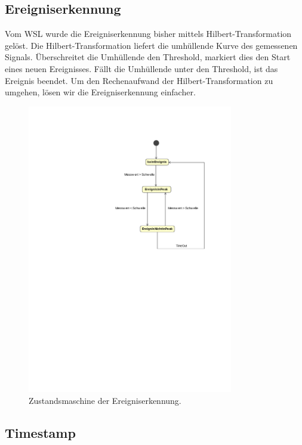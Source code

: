 \subsection{Ereigniserkennung}\label{subsec.sw_ereignis}
Vom WSL wurde die Ereigniserkennung bisher mittels Hilbert-Transformation gelöst. Die Hilbert-Transformation liefert die umhüllende Kurve des gemessenen Signals. Überschreitet die Umhüllende den Threshold, markiert dies den Start eines neuen Ereignisses. Fällt die Umhüllende unter den Threshold, ist das Ereignis beendet. Um den Rechenaufwand der Hilbert-Transformation zu umgehen, lösen wir die Ereigniserkennung einfacher.
\begin{figure}[H]
	\centering
		\includegraphics[width=0.8\textwidth]{images/magicdraw/Ereigniserkennung.pdf}
	\caption{Zustandsmaschine der Ereigniserkennung.}
	\label{fig.fsm_impact_detection}
\end{figure}


\subsection{Timestamp}\label{subsec.sw_timestamp}


